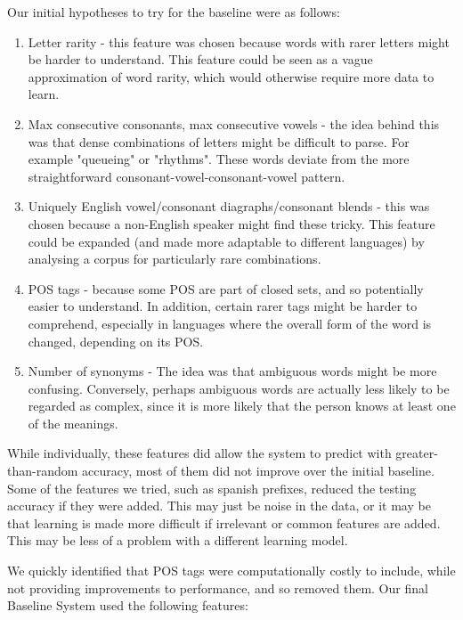 \documentclass[11pt,a4paper]{article}
\begin{document}
Our initial hypotheses to try for the baseline were as follows:
\begin{enumerate}
\item Letter rarity - this feature was chosen because words with rarer letters might be harder to understand. This feature could be seen as a vague approximation of word rarity, which would otherwise require more data to learn.
\item Max consecutive consonants, max consecutive vowels - the idea behind this was that dense combinations of letters might be difficult to parse. For example "queueing" or "rhythms". These words deviate from the more straightforward consonant-vowel-consonant-vowel pattern.
\item Uniquely English vowel/consonant diagraphs/consonant blends - this was chosen because a non-English speaker might find these tricky. This feature could be expanded (and made more adaptable to different languages) by analysing a corpus for particularly rare combinations.
\item POS tags - because some POS are part of closed sets, and so potentially easier to understand. In addition, certain rarer tags might be harder to comprehend, especially in languages where the overall form of the word is changed, depending on its POS.
\item Number of synonyms - The idea was that ambiguous words might be more confusing. Conversely, perhaps ambiguous words are actually less likely to be regarded as complex, since it is more likely that the person knows at least one of the meanings.
\end{enumerate}

While individually, these features did allow the system to predict with greater-than-random accuracy, most of them did not improve over the initial baseline. Some of the features we tried, such as spanish prefixes, reduced the testing accuracy if they were added. This may just be noise in the data, or it may be that learning is made more difficult if irrelevant or common features are added. This may be less of a problem with a different learning model.

We quickly identified that POS tags were computationally costly to include, while not providing improvements to performance, and so removed them. Our final Baseline System used the following features:
\end{document}
